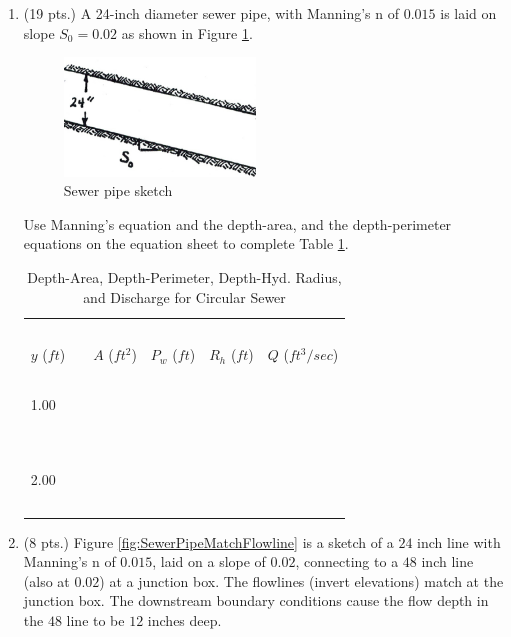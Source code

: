 \documentclass[11pt]{article}
\begin{document}
\begin{enumerate}
\clearpage
\item (19 pts.)
A 24-inch diameter sewer pipe, with Manning's n of $0.015$ is laid on slope $S_0 =0.02$ as shown in Figure \ref{fig:PipeOnSlope}.    

\begin{figure}[h!] %
\centering
   \includegraphics[width=2in]{PipeOnSlope.jpg}
   \caption{Sewer pipe sketch}
   \label{fig:PipeOnSlope} 
\end{figure}

Use Manning's equation and the depth-area, and the depth-perimeter equations on the equation sheet to complete Table \ref{tab:SewerPipes}.
\begin{table}[htbp]
   \centering
   \caption{Depth-Area, Depth-Perimeter, Depth-Hyd. Radius, and Discharge for Circular Sewer}
   \begin{tabular}{p{1in}p{1in}p{1in}p{1in}p{1in}}
   ~ & ~ & ~  & ~ & ~ \\
$y$ ($ft$)~~& $A$ ($ft^2$) & $P_w$ ($ft$) & $R_h$ ($ft$) & $Q$ ($ft^3/sec$) \\
\hline
\hline
~ & ~ & ~  & ~ & ~ \\
1.00 & ~ & ~  & ~ & ~ \\
~& ~ & ~  & ~ & ~ \\
\hline
~ & ~ & ~  & ~ & ~ \\
2.00 & ~ & ~  & ~ & ~ \\
~ & ~ & ~  & ~ & ~ \\
\hline
   \end{tabular}
   \label{tab:SewerPipes}
\end{table}

\clearpage
\item (8 pts.)
Figure \ref{fig:SewerPipeMatchFlowline} is a sketch of a $24$ inch line with Manning's n of $0.015$, laid on a slope of $0.02$, connecting to a $48$ inch line (also at $0.02$) at a junction box.   The flowlines (invert elevations) match at the junction box.  The downstream boundary conditions cause the flow depth in the $48$ line to be $12$ inches deep.


\end{enumerate}
\end{document}
